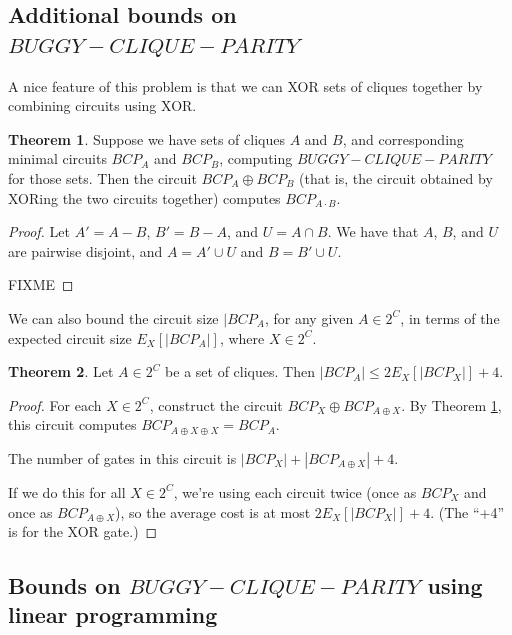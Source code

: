 \documentclass[12pt]{article}
\theoremstyle{definition}
\newtheorem{thm}{Theorem}[section]
\begin{document}
\subsection{Additional bounds on $BUGGY-CLIQUE-PARITY$}

A nice feature of this problem is that we can XOR sets of cliques together by combining circuits using XOR.

\begin{thm}
\label{parityXorCombining}
Suppose we have sets of cliques $A$ and $B$, and corresponding minimal circuits
$BCP_A$ and $BCP_B$, computing $BUGGY-CLIQUE-PARITY$ for those sets.
Then the circuit $BCP_A \oplus BCP_B$ (that is, the circuit obtained by XORing the two circuits together) 
computes $BCP_{A \cdot B}$.
\end{thm}
\begin{proof}

Let $A' = A - B$, $B' = B - A$, and $U = A \cap B$. We have that
$A$, $B$, and $U$ are pairwise disjoint, and $A = A' \cup U$ and $B = B' \cup U$.

FIXME

\end{proof}

We can also bound the circuit size $|BCP_A$, for any given $A \in 2^C$,
in terms of the expected circuit size $E_X[|BCP_A|]$, where $X \in 2^C$.

\begin{thm}
\label{parityMaxBound}
Let $A \in 2^C$ be a set of cliques.
Then $|BCP_A| \le 2 E_X[|BCP_X|] + 4$.
\end{thm}
\begin{proof}

For each $X \in 2^C$, construct the circuit $BCP_X \oplus BCP_{A \oplus X}$.
By Theorem \ref{parityXorCombining}, this circuit computes $BCP_{A \oplus X \oplus X} = BCP_A$.

The number of gates in this circuit is $|BCP_X| + |BCP_{A \oplus X}| + 4$.

If we do this for all $X \in 2^C$, we're using each circuit twice (once as $BCP_X$ and once as $BCP_{A \oplus X}$),
so the average cost is at most $2 E_X[|BCP_X|] + 4$. (The ``+4'' is for the XOR gate.)

\end{proof}





\subsection{Bounds on $BUGGY-CLIQUE-PARITY$ using linear programming}
\end{document}
